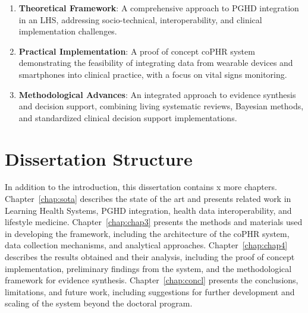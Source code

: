 \begin{enumerate}
\item \textbf{Theoretical Framework}: A comprehensive approach to PGHD integration in an LHS, addressing socio-technical, interoperability, and clinical implementation challenges.
\item \textbf{Practical Implementation}: A proof of concept coPHR system demonstrating the feasibility of integrating data from wearable devices and smartphones into clinical practice, with a focus on vital signs monitoring.
\item \textbf{Methodological Advances}: An integrated approach to evidence synthesis and decision support, combining living systematic reviews, Bayesian methods, and standardized clinical decision support implementations.
\end{enumerate}

\section{Dissertation Structure} \label{sec:struct}

In addition to the introduction, this dissertation contains x more chapters.
Chapter~\ref{chap:sota} describes the state of the art and presents related work in Learning Health Systems, PGHD integration, health data interoperability, and lifestyle medicine.
Chapter~\ref{chap:chap3} presents the methods and materials used in developing the framework, including the architecture of the coPHR system, data collection mechanisms, and analytical approaches.
Chapter~\ref{chap:chap4} describes the results obtained and their analysis, including the proof of concept implementation, preliminary findings from the system, and the methodological framework for evidence synthesis.
Chapter~\ref{chap:concl} presents the conclusions, limitations, and future work, including suggestions for further development and scaling of the system beyond the doctoral program.